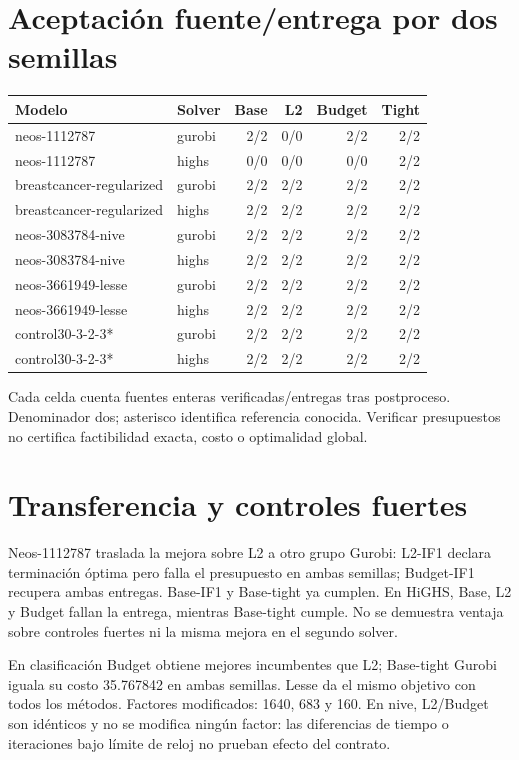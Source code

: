 \documentclass[10pt,a4paper]{article}
\begin{document}
\section*{Aceptación fuente/entrega por dos semillas}
\begin{center}\small\begin{tabular}{@{}llrrrr@{}}\toprule
Modelo & Solver & Base & L2 & Budget & Tight\\\midrule
neos-1112787 & gurobi & 2/2 & 0/0 & 2/2 & 2/2\\
neos-1112787 & highs & 0/0 & 0/0 & 0/0 & 2/2\\
breastcancer-regularized & gurobi & 2/2 & 2/2 & 2/2 & 2/2\\
breastcancer-regularized & highs & 2/2 & 2/2 & 2/2 & 2/2\\
neos-3083784-nive & gurobi & 2/2 & 2/2 & 2/2 & 2/2\\
neos-3083784-nive & highs & 2/2 & 2/2 & 2/2 & 2/2\\
neos-3661949-lesse & gurobi & 2/2 & 2/2 & 2/2 & 2/2\\
neos-3661949-lesse & highs & 2/2 & 2/2 & 2/2 & 2/2\\
control30-3-2-3* & gurobi & 2/2 & 2/2 & 2/2 & 2/2\\
control30-3-2-3* & highs & 2/2 & 2/2 & 2/2 & 2/2\\
\bottomrule\end{tabular}\end{center}
Cada celda cuenta fuentes enteras verificadas/entregas tras postproceso.
Denominador dos; asterisco identifica referencia conocida. Verificar
presupuestos no certifica factibilidad exacta, costo o optimalidad global.
\newpage
\section*{Transferencia y controles fuertes}
Neos-1112787 traslada la mejora sobre L2 a otro grupo Gurobi: L2-IF1 declara
terminación óptima pero falla el presupuesto en ambas semillas; Budget-IF1
recupera ambas entregas. Base-IF1 y Base-tight ya cumplen. En HiGHS, Base,
L2 y Budget fallan la entrega, mientras Base-tight cumple. No se demuestra
ventaja sobre controles fuertes ni la misma mejora en el segundo solver.

En clasificación Budget obtiene mejores incumbentes que L2; Base-tight
Gurobi iguala su costo 35.767842 en ambas semillas. Lesse da el mismo
objetivo con todos los métodos. Factores modificados: 1640, 683 y 160.
En nive, L2/Budget son idénticos y no se modifica ningún factor: las diferencias
de tiempo o iteraciones bajo límite de reloj no prueban efecto del contrato.
\end{document}
